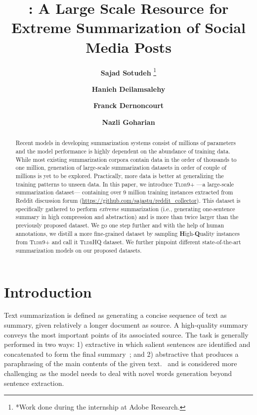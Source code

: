 \documentclass[11pt]{article}
\title{\tldrl: A Large Scale Resource for \\Extreme Summarization of Social Media Posts}
\author[1*]{\textbf{Sajad Sotudeh} \thanks{*Work done during the internship at Adobe Research.}}
\author[2]{\textbf{Hanieh Deilamsalehy}}
\author[2]{\textbf{Franck Dernoncourt}}
\author[1]{\textbf{Nazli Goharian}}
\affil[1]{IRLab, Georgetown University}
\affil[ ]{{\fontfamily{lmtt}\selectfont{ \{sajad,nazli\}@ir.cs.georgetown.edu}}}
\affil[2]{Adobe Research}
\affil[ ]{{\fontfamily{lmtt}\selectfont{
\{deilamsa,franck.dernoncourt\}@adobe.com}
}}
\newcommand{\tldrl}{\textsc{Tldr9+}}
\newcommand{\tldrs}{\textsc{TldrHQ}}
\begin{document}
\maketitle
\begin{abstract}
Recent models in developing summarization systems consist of millions of parameters and the model performance is highly dependent on the abundance of training data. While most existing summarization corpora contain data in the order of thousands to one million, generation of large-scale summarization datasets in order of couple of millions is yet to be explored. Practically, more data is better at generalizing the training patterns to unseen data. In this paper, we introduce \tldrl{} ---a large-scale summarization dataset--- containing over 9 million training instances extracted from Reddit discussion forum (\url{https://github.com/sajastu/reddit_collector}). This dataset is specifically gathered to perform \textit{extreme} summarization (i.e., generating one-sentence summary in high compression and abstraction) and is more than twice larger than the previously proposed dataset. We go one step further and with the help of human annotations, we distill a more fine-grained dataset by sampling \textbf{H}igh-\textbf{Q}uality instances from \tldrl{} and call it \tldrs{} dataset. We further pinpoint different state-of-the-art summarization models on our proposed datasets.

\end{abstract}

\section{Introduction}
Text summarization is defined as generating a concise sequence of text as summary, given relatively a longer document as source. A high-quality summary conveys the most important points of its associated source. The task is generally performed in two ways: 1) extractive in which salient sentences are identified and concatenated to form the final summary~\cite{Nallapati2017SummaRuNNerAR, Dong2018BanditSumES,Sotudeh2020OnGE, Narayan2020StepwiseES, Cho2020BetterHC}; and 2) abstractive that produces a paraphrasing of the main contents of the given text.~\cite{See2017GetTT,Gehrmann2018BottomUpAS, MacAvaney2019OntologyAwareCA, zhang2019pegasus, Sotudeh2020AttendTM, Lewis2020BARTDS, Lebanoff2020LearningTF} and is considered more challenging as the model needs to deal with novel words generation beyond sentence extraction.
\end{document}
